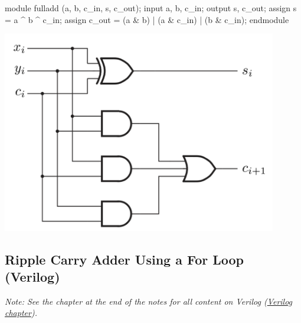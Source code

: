 \documentclass[12pt,openany]{book}
\begin{document}
\begin{minipage}[htp]{0.45\textwidth}	
	\begin{vhdl}
module fulladd (a, b, c_in, s, c_out);
	input a, b, c_in;
	output s, c_out;
	assign s = a ^ b ^ c_in;
	assign c_out = (a & b) | (a & c_in) | (b & c_in);
endmodule
	\end{vhdl}
\end{minipage}
\hfill
\vline
\hfill
\begin{minipage}[htp]{0.45\textwidth}
	\begin{center}
		\includegraphics[width=0.9\textwidth]{circuits/8.4.2.png}
	\end{center}	
\end{minipage}

\subsection{Ripple Carry Adder Using a For Loop (Verilog)}
 \textit{Note: See the chapter at the end of the notes for all content on Verilog (\hyperref[Verilog]{Verilog chapter}).}
\end{document}
